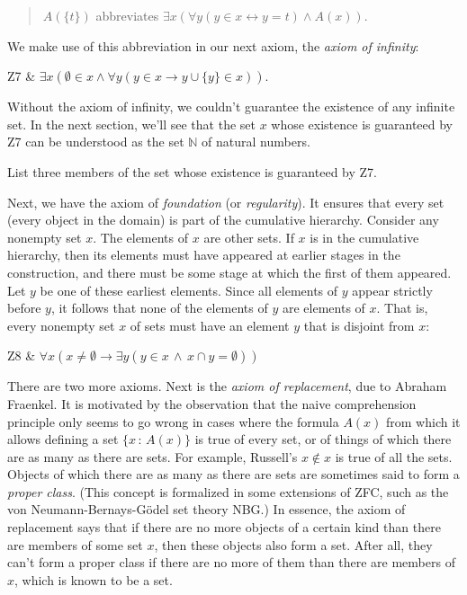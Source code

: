 \begin{quote}
  $A(\{ t \})$ abbreviates
  $\exists x(\forall y(y\in x \leftrightarrow y = t) \land A(x))$.
\end{quote}

We make use of this abbreviation in our next axiom,
the \emph{axiom of infinity}:

\begin{axioms}
  Z7 & $\exists x( \emptyset\in x \land \forall y(y\in x\to y\cup\{y\}\in x)).$
\end{axioms}

\noindent%
Without the axiom of infinity,
we couldn't guarantee the existence of any infinite set.
In the next section,
we'll see that the set $x$ whose existence is guaranteed by Z7
can be understood as the set $\mathbb{N}$ of natural numbers.

\begin{exercise}
  List three members of the set whose existence is guaranteed by Z7.
\end{exercise}

Next,
we have the axiom of \emph{foundation} (or \emph{regularity}).
It ensures that every set (every object in the domain) is part of the cumulative hierarchy.
Consider any nonempty set $x$.
The elements of $x$ are other sets.
If $x$ is in the cumulative hierarchy,
then its elements must have appeared at earlier stages in the construction,
and there must be some stage at which the first of them appeared.
Let $y$ be one of these earliest elements.
Since all elements of $y$ appear strictly before $y$,
it follows that 
none of the elements of $y$ are elements of $x$.
That is,
every nonempty set $x$ of sets must have an element $y$ that is disjoint from $x$:

\begin{axioms}
  Z8 & $\forall x( x\neq\emptyset \to \exists y(y \in x \,\land\, x\cap y = \emptyset ))$
\end{axioms}

There are two more axioms.
Next is the \emph{axiom of replacement},
due to Abraham Fraenkel.
It is motivated by the observation that
the naive comprehension principle only seems to go wrong
in cases where the formula $A(x)$ from which it allows
defining a set $\{ x \,:\, A(x) \}$ is true of every set,
or of things of which there are as many as there are sets.
For example,
Russell's $x \not\in x$ is true of all the sets.
Objects of which there are as many as there are sets are sometimes said to form a \emph{proper class}.
(This concept is formalized in some extensions of ZFC,
such as the von Neumann-Bernays-Gödel set theory NBG.)
In essence,
the axiom of replacement says that
if there are no more objects of a certain kind than there are members of some set $x$,
then these objects also form a set.
After all,
they can't form a proper class if there are no more of them than there are members of $x$,
which is known to be a set.

